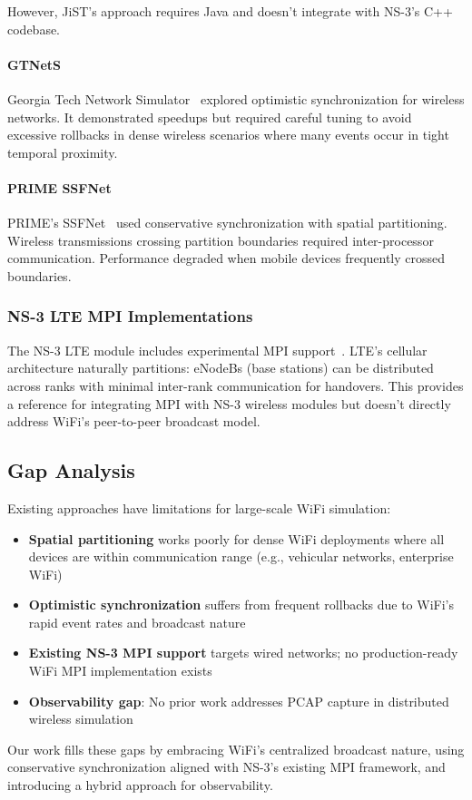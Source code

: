 However, JiST's approach requires Java and doesn't integrate with NS-3's C++ codebase.

\paragraph{GTNetS}
Georgia Tech Network Simulator~\cite{gtnet-parallel} explored optimistic synchronization for wireless networks. It demonstrated speedups but required careful tuning to avoid excessive rollbacks in dense wireless scenarios where many events occur in tight temporal proximity.

\paragraph{PRIME SSFNet}
PRIME's SSFNet~\cite{prime-wireless} used conservative synchronization with spatial partitioning. Wireless transmissions crossing partition boundaries required inter-processor communication. Performance degraded when mobile devices frequently crossed boundaries.

\subsubsection{NS-3 LTE MPI Implementations}

The NS-3 LTE module includes experimental MPI support~\cite{ns3-lte-mpi}. LTE's cellular architecture naturally partitions: eNodeBs (base stations) can be distributed across ranks with minimal inter-rank communication for handovers. This provides a reference for integrating MPI with NS-3 wireless modules but doesn't directly address WiFi's peer-to-peer broadcast model.

\subsection{Gap Analysis}

Existing approaches have limitations for large-scale WiFi simulation:

\begin{itemize}
    \item \textbf{Spatial partitioning} works poorly for dense WiFi deployments where all devices are within communication range (e.g., vehicular networks, enterprise WiFi)
    \item \textbf{Optimistic synchronization} suffers from frequent rollbacks due to WiFi's rapid event rates and broadcast nature
    \item \textbf{Existing NS-3 MPI support} targets wired networks; no production-ready WiFi MPI implementation exists
    \item \textbf{Observability gap}: No prior work addresses PCAP capture in distributed wireless simulation
\end{itemize}

Our work fills these gaps by embracing WiFi's centralized broadcast nature, using conservative synchronization aligned with NS-3's existing MPI framework, and introducing a hybrid approach for observability.
